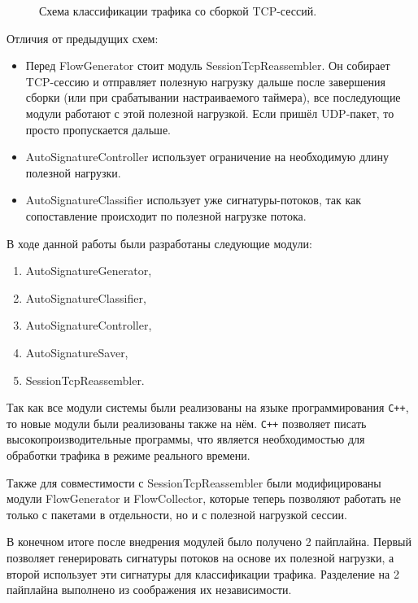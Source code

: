 \begin{figure}[H]
    \begin{center}
        
        \caption{Схема классификации трафика со сборкой TCP-сессий.}
    \end{center}
\end{figure}

Отличия от предыдущих схем:

\begin{itemize}
    \item Перед FlowGenerator стоит модуль SessionTcpReassembler.
    Он собирает TCP-сессию и отправляет полезную нагрузку дальше после завершения сборки (или при срабатывании настраиваемого таймера),
    все последующие модули работают с этой полезной нагрузкой. Если пришёл UDP-пакет, то просто пропускается дальше.
    \item AutoSignatureController использует ограничение на необходимую длину полезной нагрузки.
    \item AutoSignatureClassifier использует уже сигнатуры-потоков, так как сопоставление происходит по полезной нагрузке потока.
\end{itemize}

В ходе данной работы были разработаны следующие модули:
\begin{enumerate}
    \item AutoSignatureGenerator,
    \item AutoSignatureClassifier,
    \item AutoSignatureController,
    \item AutoSignatureSaver,
    \item SessionTcpReassembler.
\end{enumerate}

Так как все модули системы были реализованы на языке программирования \verb!C++!, то новые модули были реализованы также на нём.
\verb!C++! позволяет писать высокопроизводительные программы, что является необходимостью
для обработки трафика в режиме реального времени.

Также для совместимости с SessionTcpReassembler были модифицированы модули FlowGenerator и FlowCollector,
которые теперь позволяют работать не только с пакетами в отдельности, но и с полезной нагрузкой сессии.

В конечном итоге после внедрения модулей было получено 2 пайплайна.
Первый позволяет генерировать сигнатуры потоков на основе их полезной нагрузки,
а второй использует эти сигнатуры для классификации трафика.
Разделение на 2 пайплайна выполнено из соображения их независимости.

\newpage
